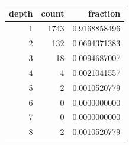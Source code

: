 \begin{tabular}{rrr}%
\hline%
\textbf{depth}&\textbf{count}&\textbf{fraction}\\%
\hline%
1&1743&0.9168858496\\%
2&132&0.0694371383\\%
3&18&0.0094687007\\%
4&4&0.0021041557\\%
5&2&0.0010520779\\%
6&0&0.0000000000\\%
7&0&0.0000000000\\%
8&2&0.0010520779\\%
\hline%
\end{tabular}
